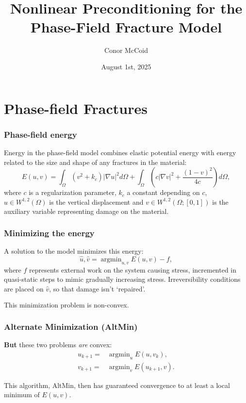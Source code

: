 \documentclass{beamer}
\title{Nonlinear Preconditioning for the Phase-Field Fracture Model}
\author{Conor McCoid}
\institute{McMaster University}
\date{August 1st, 2025}
\DeclareMathOperator*{\argmin}{argmin}
\begin{document}
\maketitle

\section{Phase-field Fractures}

\begin{frame}
\frametitle{Phase-field energy}

Energy in the phase-field model combines elastic potential energy with energy related to the size and shape of any fractures in the material:
\begin{equation*}
E(u,v) = \int_\Omega \left ( v^2 + k_c \right ) \lvert \nabla u \rvert^2 d\Omega
		+ \int_\Omega \left ( c \lvert \nabla v \rvert^2 + \frac{(1 - v)^2}{4c} \right ) d\Omega,
\end{equation*}
where $c$ is a regularization parameter, $k_c$ a constant depending on $c$, $u \in W^{1,2}(\Omega)$ is the vertical displacement and $v \in W^{1,2}(\Omega; [0,1])$ is the auxiliary variable representing damage on the material.

\end{frame}

\begin{frame}
\frametitle{Minimizing the energy}

A solution to the model minimizes this energy:
\begin{equation*}
\hat{u}, \hat{v} = \argmin_{u,v} E(u,v) - f,
\end{equation*}
where $f$ represents external work on the system causing stress, incremented in quasi-static steps to mimic gradually increasing stress.
Irreversibility conditions are placed on $\hat{v}$, so that damage isn't `repaired'.

This minimization problem is non-convex.

\end{frame}

\begin{frame}
\frametitle{Alternate Minimization (AltMin)}

\textbf{But} these two problems \textit{are} convex:
\begin{align*}
	u_{k+1} = & \argmin_u E(u, v_k), \\ v_{k+1} = & \argmin_v E(u_{k+1}, v).
\end{align*}

This algorithm, AltMin, then has guaranteed convergence to at least a local minimum of $E(u,v)$.

\end{frame}
\end{document}
